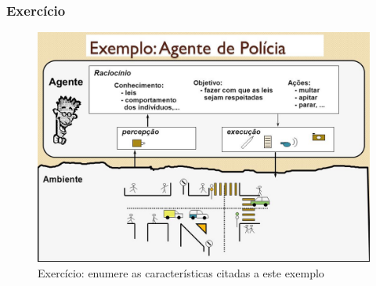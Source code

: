 \begin{frame} %

 \frametitle{Exercício}
    
\begin{figure}[!ht]
\centering
\includegraphics[height =.7\textheight,width=.8\textwidth]{figuras/agente_policial.jpg}
\caption{Exercício: enumere as características citadas a este exemplo}
\end{figure}

\end{frame}



